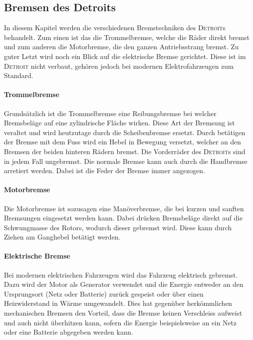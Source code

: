 \subsection{Bremsen des Detroits}\label{bremse}

In diesem Kapitel werden die verschiedenen Bremstechniken des \textsc{Detroit}s behandelt. Zum einen ist das die Trommelbremse, welche die Räder direkt bremst und zum anderen die Motorbremse, die den ganzen Antriebsstrang bremst. Zu guter Letzt wird noch ein Blick auf die elektrische Bremse gerichtet. Diese ist im \textsc{Detroit} nicht verbaut, gehören jedoch bei modernen Elektrofahrzeugen zum Standard.

\paragraph{Trommelbremse}

Grundsätzlich ist die Trommelbremse eine Reibungsbremse bei welcher Bremsbeläge auf eine zylindrische Fläche wirken. Diese Art der Bremsung ist veraltet und wird heutzutage durch die Scheibenbremse ersetzt. Durch betätigen der Bremse mit dem Fuss wird ein Hebel in Bewegung versetzt, welcher an den Bremsen der beiden hinteren Rädern bremst. Die Vorderräder des \textsc{Detroit}s sind in jedem Fall ungebremst. Die normale Bremse kann auch durch die Handbremse arretiert werden. Dabei ist die Feder der Bremse immer angezogen.

\paragraph{Motorbremse}

Die Motorbremse ist sozusagen eine Manöverbremse, die bei kurzen und sanften Bremsungen eingesetzt werden kann. Dabei drücken Bremsbeläge direkt auf die Schwungmasse des Rotors, wodurch dieser gebremst wird. Diese kann durch Ziehen am Ganghebel betätigt werden.

\paragraph{Elektrische Bremse}
Bei modernen elektrischen Fahrzeugen wird das Fahrzeug elektrisch gebremst. Dazu wird der Motor als Generator verwendet und die Energie entweder an den Ursprungsort (Netz oder Batterie) zurück gespeist oder über einen Heizwiderstand in Wärme umgewandelt. Dies hat gegenüber herkömmlichen mechanischen Bremsen den Vorteil, dass die Bremse keinen Verschleiss aufweist und auch nicht überhitzen kann, sofern die Energie beispielsweise an ein Netz oder eine Batterie abgegeben werden kann.

